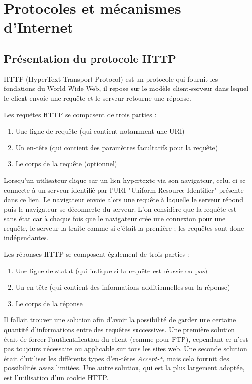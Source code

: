 \chapter{Protocoles et mécanismes d'Internet}

\section{Présentation du protocole HTTP}
\label{http-expl}
HTTP (HyperText Transport Protocol) \cite{Obo_CNP3} est un protocole qui fournit les fondations du World Wide Web, il repose sur le modèle client-serveur dans lequel le client envoie une requête et le serveur retourne une réponse.
\newline

Les requêtes HTTP se composent de trois parties :
\begin{enumerate}
	\item Une ligne de requête (qui contient notamment une URI)
	\item Un en-tête (qui contient des paramètres facultatifs pour la requête)
	\item Le corps de la requête (optionnel)
	\newline
\end{enumerate}

Lorsqu'un utilisateur clique sur un lien hypertexte via son navigateur, celui-ci se connecte à un serveur identifié par l'URI "Uniform Resource Identifier" présente dans ce lien. Le navigateur envoie alors une requête à laquelle le serveur répond puis le navigateur se déconnecte du serveur.
L'on considère que la requête est sans état car à chaque fois que le navigateur crée une connexion pour une requête, le serveur la traite comme si c'était la première ; les requêtes sont donc indépendantes.
\newline

Les réponses HTTP se composent également de trois parties :
\begin{enumerate}
	\item Une ligne de statut (qui indique si la requête est réussie ou pas)
	\item Un en-tête (qui contient des informations additionnelles sur la réponse)
	\item Le corps de la réponse
	\newline
\end{enumerate}

Il fallait trouver une solution afin d'avoir la possibilité de garder une certaine quantité d'informations entre des requêtes successives. Une première solution était de forcer l'authentification du client (comme pour FTP), cependant ce n'est pas toujours nécessaire ou applicable sur tous les sites web. Une seconde solution était d'utiliser les différents types d'en-têtes \emph{Accept-*}, mais cela fournit des possibilités assez limitées. Une autre solution, qui est la plus largement adoptée, est l'utilisation d'un cookie HTTP.

